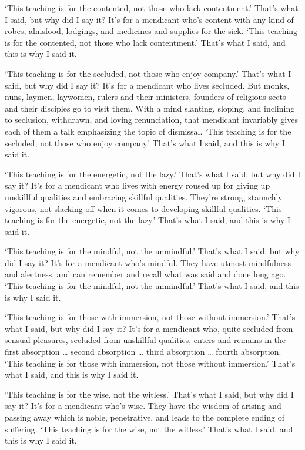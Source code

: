 \documentclass[12pt,openany]{book}%
\begin{document}
‘This teaching is for the contented, not those who lack contentment.’ That’s what I said, but why did I say it? It’s for a mendicant who’s content with any kind of robes, almsfood, lodgings, and medicines and supplies for the sick. ‘This teaching is for the contented, not those who lack contentment.’ That’s what I said, and this is why I said it. 

‘This teaching is for the secluded, not those who enjoy company.’ That’s what I said, but why did I say it? It’s for a mendicant who lives secluded. But monks, nuns, laymen, laywomen, rulers and their ministers, founders of religious sects and their disciples go to visit them. With a mind slanting, sloping, and inclining to seclusion, withdrawn, and loving renunciation, that mendicant invariably gives each of them a talk emphasizing the topic of dismissal. ‘This teaching is for the secluded, not those who enjoy company.’ That’s what I said, and this is why I said it. 

‘This teaching is for the energetic, not the lazy.’ That’s what I said, but why did I say it? It’s for a mendicant who lives with energy roused up for giving up unskillful qualities and embracing skillful qualities. They’re strong, staunchly vigorous, not slacking off when it comes to developing skillful qualities. ‘This teaching is for the energetic, not the lazy.’ That’s what I said, and this is why I said it. 

‘This teaching is for the mindful, not the unmindful.’ That’s what I said, but why did I say it? It’s for a mendicant who’s mindful. They have utmost mindfulness and alertness, and can remember and recall what was said and done long ago. ‘This teaching is for the mindful, not the unmindful.’ That’s what I said, and this is why I said it. 

‘This teaching is for those with immersion, not those without immersion.’ That’s what I said, but why did I say it? It’s for a mendicant who, quite secluded from sensual pleasures, secluded from unskillful qualities, enters and remains in the first absorption … second absorption … third absorption … fourth absorption. ‘This teaching is for those with immersion, not those without immersion.’ That’s what I said, and this is why I said it. 

‘This teaching is for the wise, not the witless.’ That’s what I said, but why did I say it? It’s for a mendicant who’s wise. They have the wisdom of arising and passing away which is noble, penetrative, and leads to the complete ending of suffering. ‘This teaching is for the wise, not the witless.’ That’s what I said, and this is why I said it. 
\end{document}
